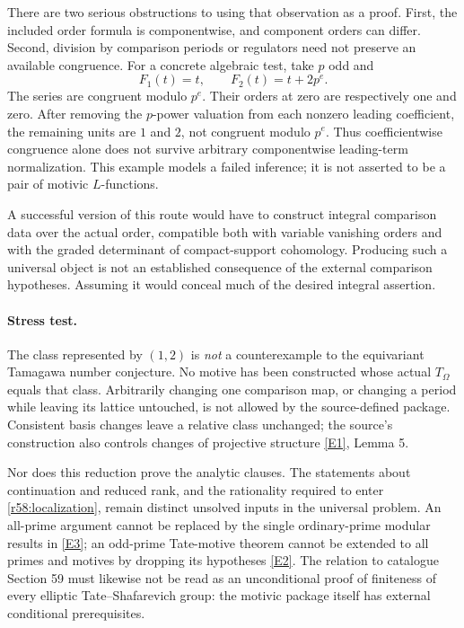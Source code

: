\documentclass[11pt,a4paper]{article}
\newcommand{\eref}[2]{\hyperlink{extra:#1:#2}{[E#2]}}
\numberwithin{equation}{section}
\begin{document}
There are two serious obstructions to using that observation as a proof. First, the included order formula is componentwise, and component orders can differ. Second, division by comparison periods or regulators need not preserve an available congruence. For a concrete algebraic test, take $p$ odd and
\[
 F_1(t)=t,\qquad F_2(t)=t+2p^e.
\]
The series are congruent modulo $p^e$. Their orders at zero are respectively one and zero. After removing the $p$-power valuation from each nonzero leading coefficient, the remaining units are $1$ and $2$, not congruent modulo $p^e$. Thus coefficientwise congruence alone does not survive arbitrary componentwise leading-term normalization. This example models a failed inference; it is not asserted to be a pair of motivic $L$-functions.

A successful version of this route would have to construct integral comparison data over the actual order, compatible both with variable vanishing orders and with the graded determinant of compact-support cohomology. Producing such a universal object is not an established consequence of the external comparison hypotheses. Assuming it would conceal much of the desired integral assertion.

\paragraph{Stress test.}
The class represented by $(1,2)$ is \emph{not} a counterexample to the equivariant Tamagawa number conjecture. No motive has been constructed whose actual $T_\Omega$ equals that class. Arbitrarily changing one comparison map, or changing a period while leaving its lattice untouched, is not allowed by the source-defined package. Consistent basis changes leave a relative class unchanged; the source's construction also controls changes of projective structure \eref{58}{1}, Lemma 5.

Nor does this reduction prove the analytic clauses. The statements about continuation and reduced rank, and the rationality required to enter \eqref{r58:localization}, remain distinct unsolved inputs in the universal problem. An all-prime argument cannot be replaced by the single ordinary-prime modular results in \eref{58}{3}; an odd-prime Tate-motive theorem cannot be extended to all primes and motives by dropping its hypotheses \eref{58}{2}. The relation to catalogue Section 59 must likewise not be read as an unconditional proof of finiteness of every elliptic Tate--Shafarevich group: the motivic package itself has external conditional prerequisites.
\end{document}
